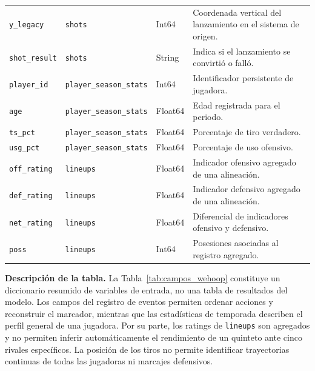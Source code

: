 {\begin{longtable}{@{}p{3.2cm}p{3.2cm}p{1.65cm}p{4.9cm}@{}}
\texttt{y\_legacy} & \texttt{shots} & Int64 & Coordenada vertical del lanzamiento en el sistema de origen.\\
\texttt{shot\_result} & \texttt{shots} & String & Indica si el lanzamiento se convirtió o falló.\\
\texttt{player\_id} & \texttt{player\_season\_stats} & Int64 & Identificador persistente de jugadora.\\
\texttt{age} & \texttt{player\_season\_stats} & Float64 & Edad registrada para el periodo.\\
\texttt{ts\_pct} & \texttt{player\_season\_stats} & Float64 & Porcentaje de tiro verdadero.\\
\texttt{usg\_pct} & \texttt{player\_season\_stats} & Float64 & Porcentaje de uso ofensivo.\\
\texttt{off\_rating} & \texttt{lineups} & Float64 & Indicador ofensivo agregado de una alineación.\\
\texttt{def\_rating} & \texttt{lineups} & Float64 & Indicador defensivo agregado de una alineación.\\
\texttt{net\_rating} & \texttt{lineups} & Float64 & Diferencial de indicadores ofensivo y defensivo.\\
\texttt{poss} & \texttt{lineups} & Int64 & Posesiones asociadas al registro agregado.\\
\end{longtable}
}

\noindent\textbf{Descripción de la tabla.}
La Tabla~\ref{tab:campos_wehoop} constituye un diccionario resumido de variables de entrada, no una tabla de resultados del modelo. Los campos del registro de eventos permiten ordenar acciones y reconstruir el marcador, mientras que las estadísticas de temporada describen el perfil general de una jugadora. Por su parte, los ratings de \texttt{lineups} son agregados y no permiten inferir automáticamente el rendimiento de un quinteto ante cinco rivales específicos. La posición de los tiros no permite identificar trayectorias continuas de todas las jugadoras ni marcajes defensivos.